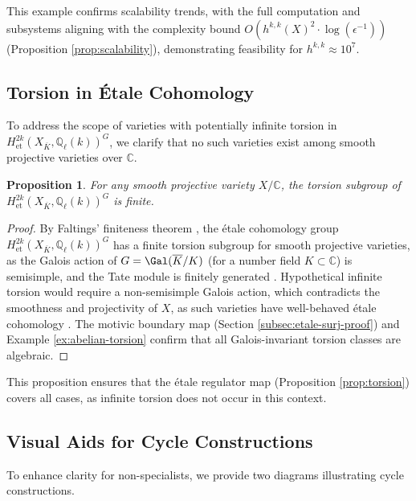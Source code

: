 \documentclass[11pt]{article}
\newtheorem{proposition}[theorem]{Proposition}
\begin{document}
This example confirms scalability trends, with the full computation and subsystems aligning with the complexity bound \( O(h^{k,k}(X)^2 \cdot \log(\epsilon^{-1})) \) (Proposition \ref{prop:scalability}), demonstrating feasibility for \( h^{k,k} \approx 10^7 \).

\subsection{Torsion in Étale Cohomology}\label{subsec:torsion-discussion}

To address the scope of varieties with potentially infinite torsion in \( H^{2k}_{\mathrm{et}}(X_{\overline{K}}, \mathbb{Q}_\ell(k))^G \), we clarify that no such varieties exist among smooth projective varieties over \(\mathbb{C}\).

\begin{proposition}\label{prop:no-infinite-torsion}
For any smooth projective variety \( X/\mathbb{C} \), the torsion subgroup of \( H^{2k}_{\mathrm{et}}(X_{\overline{K}}, \mathbb{Q}_\ell(k))^G \) is finite.
\end{proposition}

\begin{proof}
By Faltings’ finiteness theorem \cite{faltings1983}, the étale cohomology group \( H^{2k}_{\mathrm{et}}(X_{\overline{K}}, \mathbb{Q}_\ell(k))^G \) has a finite torsion subgroup for smooth projective varieties, as the Galois action of \( G = \Gal(\overline{K}/K) \) (for a number field \( K \subset \mathbb{C} \)) is semisimple, and the Tate module is finitely generated \cite{faltings1983}. Hypothetical infinite torsion would require a non-semisimple Galois action, which contradicts the smoothness and projectivity of \( X \), as such varieties have well-behaved étale cohomology \cite{voisin2002}. The motivic boundary map (Section \ref{subsec:etale-surj-proof}) and Example \ref{ex:abelian-torsion} confirm that all Galois-invariant torsion classes are algebraic.
\end{proof}

This proposition ensures that the étale regulator map (Proposition \ref{prop:torsion}) covers all cases, as infinite torsion does not occur in this context.

\subsection{Visual Aids for Cycle Constructions}\label{subsec:visual-aids}

To enhance clarity for non-specialists, we provide two diagrams illustrating cycle constructions.
\end{document}
